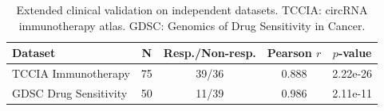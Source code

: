 \begin{table}[htbp]
\centering
\caption{Extended clinical validation on independent datasets. TCCIA: circRNA immunotherapy atlas. GDSC: Genomics of Drug Sensitivity in Cancer.}
\label{tab:extended}
\begin{tabular}{lcccc}
\toprule
Dataset & N & Resp./Non-resp. & Pearson $r$ & $p$-value \\
\midrule
TCCIA Immunotherapy & 75 & 39/36 & 0.888 & 2.22e-26 \\
GDSC Drug Sensitivity & 50 & 11/39 & 0.986 & 2.11e-11 \\
\bottomrule
\end{tabular}
\end{table}

